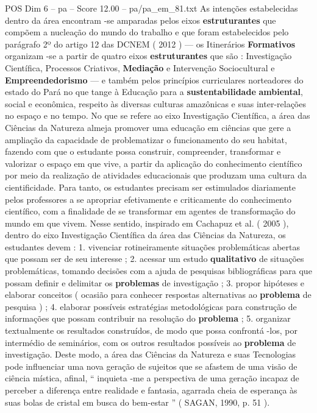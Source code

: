 \begin{textsample}{POS Dim 6 – pa – Score 12.00 – pa/pa\_em\_81.txt}
As intenções estabelecidas dentro da área encontram -se amparadas pelos eixos \textbf{estruturantes} que compõem a nucleação do mundo do trabalho e que foram estabelecidos pelo parágrafo 2º do artigo 12 das DCNEM ( 2012 ) — os Itinerários \textbf{Formativos} organizam -se a partir de quatro eixos \textbf{estruturantes} que são : Investigação Científica, Processos Criativos, \textbf{Mediação} e Intervenção Sociocultural e \textbf{Empreendedorismo} — e também pelos princípios curriculares norteadores do estado do Pará no que tange à Educação para a \textbf{sustentabilidade} \textbf{ambiental}, social e econômica, respeito às diversas culturas amazônicas e suas inter-relações no espaço e no tempo.
No que se refere ao eixo Investigação Científica, a área das Ciências da Natureza almeja promover uma educação em ciências que gere a ampliação da capacidade de problematizar o funcionamento do seu habitat, fazendo com que o estudante possa construir, compreender, transformar e valorizar o espaço em que vive, a partir da aplicação do conhecimento científico por meio da realização de atividades educacionais que produzam uma cultura da cientificidade.
Para tanto, os estudantes precisam ser estimulados diariamente pelos professores a se apropriar efetivamente e criticamente do conhecimento científico, com a finalidade de se transformar em agentes de transformação do mundo em que vivem.
Nesse sentido, inspirado em Cachapuz et al. ( 2005 ), dentro do eixo Investigação Científica da área das Ciências da Natureza, os estudantes devem : 1. vivenciar rotineiramente situações problemáticas abertas que possam ser de seu interesse ; 2. acessar um estudo \textbf{qualitativo} de situações problemáticas, tomando decisões com a ajuda de pesquisas bibliográficas para que possam definir e delimitar os \textbf{problemas} de investigação ; 3. propor hipóteses e elaborar conceitos ( ocasião para conhecer respostas alternativas ao \textbf{problema} de pesquisa ) ; 4. elaborar possíveis estratégias metodológicas para construção de informações que possam contribuir na resolução do \textbf{problema} ; 5. organizar textualmente os resultados construídos, de modo que possa confrontá -los, por intermédio de seminários, com os outros resultados possíveis ao \textbf{problema} de investigação.
Deste modo, a área das Ciências da Natureza e suas Tecnologias pode influenciar uma nova geração de sujeitos que se afastem de uma visão de ciência mística, afinal, “ inquieta -me a perspectiva de uma geração incapaz de perceber a diferença entre realidade e fantasia, agarrada cheia de esperança às suas bolas de cristal em busca do bem-estar ” ( SAGAN, 1990, p. 51 ).

\end{textsample}
